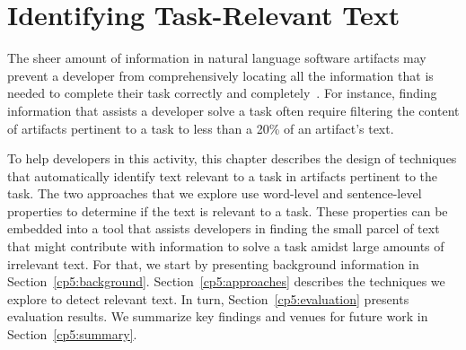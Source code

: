 \setcounter{chapter}{0}


\chapter{Identifying Task-Relevant Text}
\label{ch:identifying}


The sheer amount of information in natural language software artifacts may prevent a developer from comprehensively locating all the information that is needed to complete their task correctly and completely~\cite{Murphy2005}.
For instance,
finding information that assists a developer solve a 
task often require filtering
the content of artifacts pertinent to a task 
to less than a 20\% of an artifact's text.


To help developers in this activity, 
this chapter describes the design of techniques
that automatically identify text relevant
to a task in artifacts
pertinent to the task.
The two approaches that we explore use 
word-level and sentence-level
properties
to determine if the text is relevant to a task.
These properties can be embedded into a tool that 
assists developers
in finding the small parcel of text that might contribute with 
information to solve a task amidst large amounts of irrelevant text.
For that, we start by presenting background information in Section~\ref{cp5:background}.
Section~\ref{cp5:approaches} describes the techniques
we explore to detect relevant text. In turn, 
Section~\ref{cp5:evaluation} presents evaluation results.
We summarize key findings 
and venues for future work in Section~\ref{cp5:summary}.

